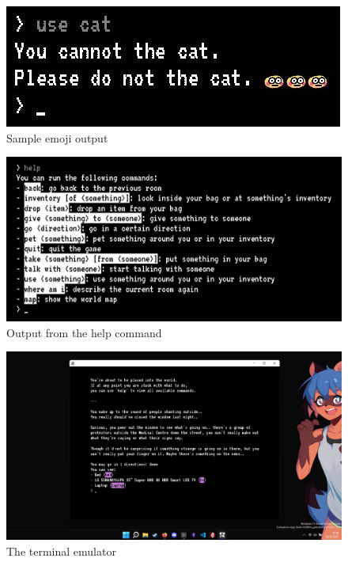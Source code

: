 \documentclass{article}
\begin{document}
    \begin{figure}
        \centering
        \includegraphics[width=\textwidth]{images/emoji.jpg}
        \caption{Sample emoji output} \label{fig:emoji}
    \end{figure}
    \begin{figure}
        \centering
        \includegraphics[width=\textwidth]{images/help-command.jpg}
        \caption{Output from the help command} \label{fig:help-command}
    \end{figure}
    \begin{figure}
        \centering
        \includegraphics[width=\textwidth]{images/terminal.jpg}
        \caption{The terminal emulator} \label{fig:terminal}
    \end{figure}
\end{document}
